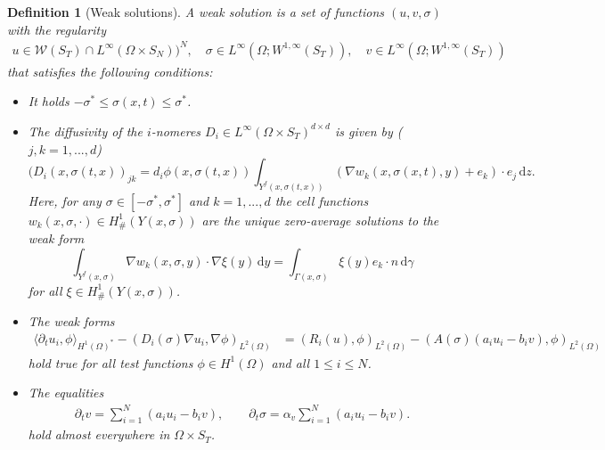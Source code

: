 \documentclass[reqno, 11pt]{amsart}
\newtheorem{defn}[thm]{Definition}
\numberwithin{equation}{section}
\newcommand{\di}[1]{\,\mathrm{d}#1}
\begin{document}
\begin{defn}[Weak solutions]\label{def:weak_solution}
A weak solution is a set of functions $(u,v,\sigma)$ with the regularity
%
\begin{align*}
u\in \mathcal{W}(S_T)\cap L^\infty(\Omega\times S_N))^N,\quad \sigma\in L^\infty(\Omega;W^{1,\infty}(S_T)),\quad
v\in L^\infty(\Omega;W^{1,\infty}(S_T))
\end{align*}
that satisfies the following conditions:
\begin{itemize}
    \item[$(i)$] It holds $-\sigma^*\le\sigma(x,t)\le\sigma^*$.
    \item[$(ii)$] The diffusivity of the $i$-nomeres $D_i\in L^\infty(\Omega\times S_T)^{d\times d}$ is given by ($j,k=1,...,d$)
    \[
    (D_i(x,\sigma(t,x))_{jk}=d_i\phi(x,\sigma(t,x))\int_{Y^f(x,\sigma(t,x))}(\nabla w_{k}(x,\sigma(x,t),y)+e_{k})\cdot e_j\di{z}.
    \]
    Here, for any $\sigma\in[-\sigma^*,\sigma^*]$ and $k=1,...,d$ the cell functions $w_{k}(x,\sigma,\cdot)\in H^1_\#(Y(x,\sigma))$ are the unique zero-average solutions to the weak form
    \[
    \int_{Y^f(x,\sigma)}\nabla w_k(x,\sigma,y)\cdot\nabla\xi(y)\di{y}=\int_{\Gamma(x,\sigma)}\xi(y)e_k\cdot n\di{\gamma}
    \]
    for all $\xi\in H^1_\#(Y(x,\sigma))$.
    \item[$(iii)$] The weak forms
    \begin{align*}
    \langle\partial_t u_i,\phi\rangle_{H^1(\Omega)^*}-(D_i(\sigma)\nabla u_i,\nabla\phi)_{L^2(\Omega)} &=(R_i(u),\phi)_{L^2(\Omega)}-(A(\sigma)(a_iu_i- b_iv),\phi)_{L^2(\Omega)}
    \end{align*}
    hold true for all test functions $\phi\in H^1(\Omega)$ and all $1\leq i\leq N$.
    \item[$(iv)$] The equalities
    \begin{align*}
     \partial_tv=\sum_{i=1}^N(a_iu_i- b_iv),\qquad
     \partial_t\sigma=\alpha_v\sum_{i=1}^N(a_iu_i- b_iv).
    \end{align*}
    hold almost everywhere in $\Omega\times S_T$.
\end{itemize}
%
\end{defn}






\end{document}
